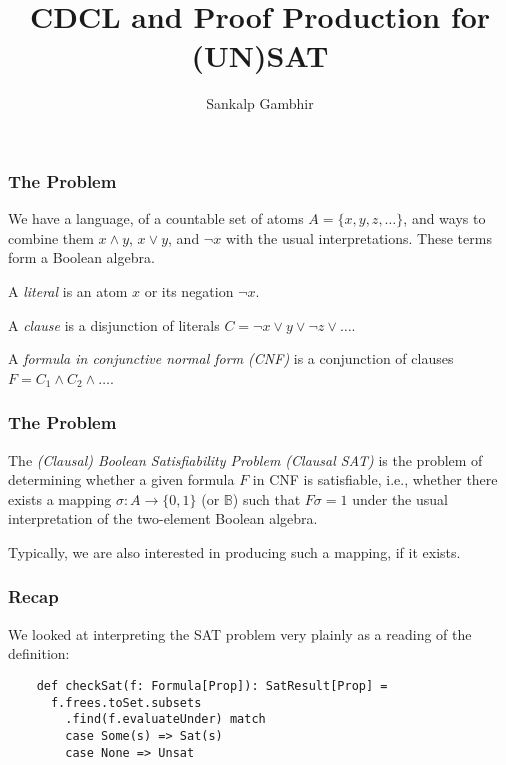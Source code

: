 \documentclass[
  aspectratio=1610, 
  xcolor={dvipsnames},
]{beamer}
\title{CDCL and Proof Production for (UN)SAT}
\author{Sankalp Gambhir}
\begin{document}
\maketitle

\begin{frame}
  \frametitle{The Problem}

  We have a language, of a countable set of atoms $A = \{x, y, z, \ldots\}$, and
  ways to combine them $x \land y$, $x \lor y$, and $\neg x$ with the usual
  interpretations. These terms form a Boolean algebra.

  \pause
  A \emph{literal} is an atom $x$ or its negation $\neg x$. 
  
  \pause
  A \emph{clause} is a disjunction of literals $C = \neg x \lor y \lor \neg z \lor \ldots$.

  \pause
  A \emph{formula in conjunctive normal form (CNF)} is a conjunction of clauses $F =
  C_1 \land C_2 \land \ldots$.


\end{frame}

\begin{frame}
  \frametitle{The Problem}

  The \emph{(Clausal) Boolean Satisfiability Problem (Clausal SAT)} is the
  problem of determining whether a given formula $F$ in CNF is satisfiable,
  i.e., whether there exists a mapping \(\sigma: A \to \{0, 1\}\) (or
  \(\mathbb{B}\)) such that \(F\sigma = 1\) under the usual interpretation of
  the two-element Boolean algebra.

  Typically, we are also interested in producing such a mapping, if it exists.

\end{frame}

\begin{frame}[fragile]
  \frametitle{Recap}

  We looked at interpreting the SAT problem very plainly as a reading of the
  definition:

  \begin{lstlisting}
    def checkSat(f: Formula[Prop]): SatResult[Prop] =
      f.frees.toSet.subsets
        .find(f.evaluateUnder) match
        case Some(s) => Sat(s)
        case None => Unsat
  \end{lstlisting}

\end{frame}
\end{document}
